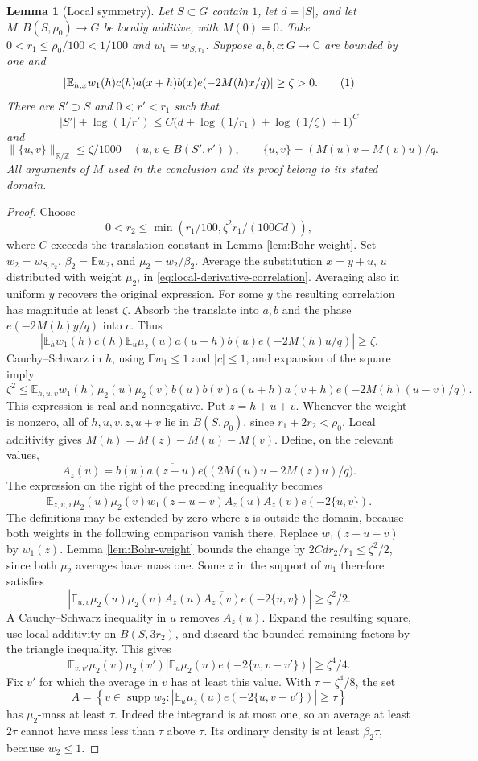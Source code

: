 \documentclass[11pt]{article}
\newtheorem{lemma}[theorem]{Lemma}
\theoremstyle{definition}
\newcommand{\R}{\mathbb R}
\newcommand{\Z}{\mathbb Z}
\newcommand{\C}{\mathbb C}
\newcommand{\E}{\mathbb E}
\newcommand{\supp}{\operatorname{supp}}
\newcommand{\eqtag}[1]{\refstepcounter{equation}\tag{\theequation}\label{#1}}
\numberwithin{equation}{section}
\begin{document}
\begin{lemma}[Local symmetry]\label{lem:local-symmetry}
Let $S\subset G$ contain $1$, let $d=|S|$, and let $M:B(S,\rho_0)\to G$ be locally additive, with $M(0)=0$. Take $0<r_1\le\rho_0/100<1/100$ and $w_1=w_{S,r_1}$. Suppose $a,b,c:G\to\C$ are bounded by one and
\[
 \left|\E_{h,x} w_1(h)c(h)a(x+h)b(x)e(-2M(h)x/q)\right|\ge\zeta>0.
 \eqtag{eq:local-derivative-correlation}
\]
There are $S'\supset S$ and $0<r'<r_1$ such that
\[
 |S'|+\log(1/r')\le C\bigl(d+\log(1/r_1)+\log(1/\zeta)+1\bigr)^C
\]
and
\[
 \|\{u,v\}\|_{\R/\Z}\le\zeta/1000
 \quad(u,v\in B(S',r')),\qquad
 \{u,v\}=(M(u)v-M(v)u)/q.
\]
All arguments of $M$ used in the conclusion and its proof belong to its stated domain.
\end{lemma}
\begin{proof}
Choose
\[
 0<r_2\le\min(r_1/100,\zeta^2r_1/(100C d)),
\]
where $C$ exceeds the translation constant in Lemma \ref{lem:Bohr-weight}. Set $w_2=w_{S,r_2}$, $\beta_2=\E w_2$, and $\mu_2=w_2/\beta_2$. Average the substitution $x=y+u$, $u$ distributed with weight $\mu_2$, in \eqref{eq:local-derivative-correlation}. Averaging also in uniform $y$ recovers the original expression. For some $y$ the resulting correlation has magnitude at least $\zeta$. Absorb the translate into $a,b$ and the phase $e(-2M(h)y/q)$ into $c$. Thus
\[
 \left|\E_h w_1(h)c(h)\E_u\mu_2(u)a(u+h)b(u)e(-2M(h)u/q)\right|\ge\zeta.
\]
Cauchy--Schwarz in $h$, using $\E w_1\le1$ and $|c|\le1$, and expansion of the square imply
\[
 \zeta^2\le\E_{h,u,v}w_1(h)\mu_2(u)\mu_2(v)
 b(u)\overline{b(v)}a(u+h)\overline{a(v+h)}
 e(-2M(h)(u-v)/q).
\]
This expression is real and nonnegative. Put $z=h+u+v$. Whenever the weight is nonzero, all of $h,u,v,z,u+v$ lie in $B(S,\rho_0)$, since $r_1+2r_2<\rho_0$. Local additivity gives $M(h)=M(z)-M(u)-M(v)$. Define, on the relevant values,
\[
 A_z(u)=b(u)\overline{a(z-u)}e\bigl((2M(u)u-2M(z)u)/q\bigr).
\]
The expression on the right of the preceding inequality becomes
\[
 \E_{z,u,v}\mu_2(u)\mu_2(v)w_1(z-u-v)
 A_z(u)\overline{A_z(v)}e(-2\{u,v\}).
\]
The definitions may be extended by zero where $z$ is outside the domain, because both weights in the following comparison vanish there. Replace $w_1(z-u-v)$ by $w_1(z)$. Lemma \ref{lem:Bohr-weight} bounds the change by $2Cd r_2/r_1\le\zeta^2/2$, since both $\mu_2$ averages have mass one. Some $z$ in the support of $w_1$ therefore satisfies
\[
 \left|\E_{u,v}\mu_2(u)\mu_2(v) A_z(u)\overline{A_z(v)}e(-2\{u,v\})\right|\ge\zeta^2/2.
\]
A Cauchy--Schwarz inequality in $u$ removes $A_z(u)$. Expand the resulting square, use local additivity on $B(S,3r_2)$, and discard the bounded remaining factors by the triangle inequality. This gives
\[
 \E_{v,v'}\mu_2(v)\mu_2(v')
 \left|\E_u\mu_2(u)e(-2\{u,v-v'\})\right|\ge\zeta^4/4.
\]
Fix $v'$ for which the average in $v$ has at least this value. With $\tau=\zeta^4/8$, the set
\[
 A=\left\{v\in\supp w_2:
 \left|\E_u\mu_2(u)e(-2\{u,v-v'\})\right|\ge\tau\right\}
\]
has $\mu_2$-mass at least $\tau$. Indeed the integrand is at most one, so an average at least $2\tau$ cannot have mass less than $\tau$ above $\tau$. Its ordinary density is at least $\beta_2\tau$, because $w_2\le1$.


\end{proof}
\end{document}
